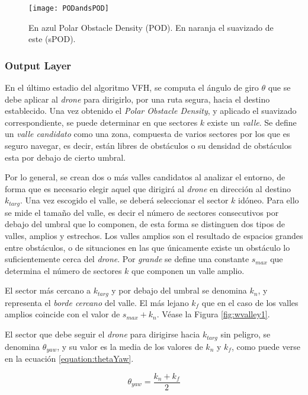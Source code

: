  \begin{figure}
	\centering
	\texttt{[image: PODandsPOD]}
	\caption[POD vs smoothPOD.]{En azul Polar Obstacle Density (POD). En naranja el suavizado de este (sPOD).}\label{fig:PODandsPOD}
\end{figure}

\subsubsection{Output Layer}
\label{subsubsec:OL}
En el último estadio del algoritmo VFH, se computa el ángulo de giro $\theta$ que se debe aplicar al \emph{drone} para dirigirlo, por una ruta segura, hacia el destino establecido.
Una vez obtenido el \textit{Polar Obstacle Density}, y aplicado el suavizado correspondiente, se puede determinar en que sectores $k$ existe un \textit{valle}. Se define un \textit{valle candidato} como una zona, compuesta de varios sectores por los que es seguro navegar, es decir, están libres de obstáculos o su densidad de obstáculos esta por debajo de cierto umbral. 

Por lo general, se crean dos o más valles candidatos al analizar el entorno, de forma que es necesario elegir aquel que dirigirá al \emph{drone} en dirección al destino $k_\mathit{targ}$. Una vez escogido el valle, se deberá seleccionar el sector $k$ idóneo. Para ello se mide el tamaño del valle, es decir el número de sectores consecutivos por debajo del umbral que lo componen, de esta forma se distinguen dos tipos de valles, amplios y estrechos. 
Los valles amplios son el resultado de espacios grandes entre obstáculos, o de situaciones en las que únicamente existe un obstáculo lo suficientemente cerca del \emph{drone}. Por \textit{grande} se define una constante $s_\mathit{max}$ que determina el número de sectores $k$ que componen un valle amplio.

El sector más cercano a $k_\mathit{targ}$ y por debajo del umbral se denomina $k_n$, y representa el \textit{borde cercano} del valle. El más lejano $k_f$ que en el caso de los valles amplios coincide con el valor de $s_\mathit{max} + k_n$.  Véase la Figura \ref{fig:wvalley1}.

El sector que debe seguir el \emph{drone} para dirigirse hacia $k_\mathit{targ}$ sin peligro, se denomina $\theta_\mathit{yaw}$, y su valor es la media de los valores de $k_n$ y $k_f$, como puede verse en la ecuación \ref{equation:thetaYaw}.

\begin{equation}
\theta_\mathit{yaw} = \frac{k_n + k_f}{2}
\label{equation:thetaYaw}
\end{equation}


